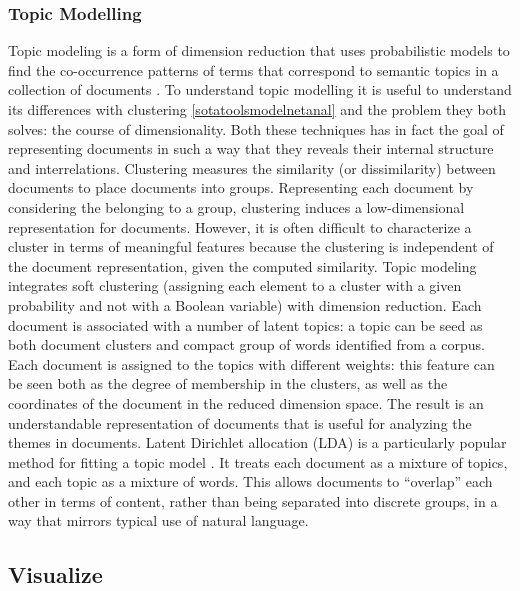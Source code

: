 \documentclass[]{book}
\begin{document}
\subsubsection{Topic Modelling}\label{sotatoolsmodeltopicmodel}

Topic modeling is a form of dimension reduction that uses probabilistic
models to find the co-occurrence patterns of terms that correspond to
semantic topics in a collection of documents
\citep{crain2012dimensionality}. To understand topic modelling it is
useful to understand its differences with clustering
\ref{sotatoolsmodelnetanal} and the problem they both solves: the course
of dimensionality. Both these techniques has in fact the goal of
representing documents in such a way that they reveals their internal
structure and interrelations. Clustering measures the similarity (or
dissimilarity) between documents to place documents into groups.
Representing each document by considering the belonging to a group,
clustering induces a low-dimensional representation for documents.
However, it is often difficult to characterize a cluster in terms of
meaningful features because the clustering is independent of the
document representation, given the computed similarity. Topic modeling
integrates soft clustering (assigning each element to a cluster with a
given probability and not with a Boolean variable) with dimension
reduction. Each document is associated with a number of latent topics: a
topic can be seed as both document clusters and compact group of words
identified from a corpus. Each document is assigned to the topics with
different weights: this feature can be seen both as the degree of
membership in the clusters, as well as the coordinates of the document
in the reduced dimension space. The result is an understandable
representation of documents that is useful for analyzing the themes in
documents. Latent Dirichlet allocation (LDA) is a particularly popular
method for fitting a topic model \citep{blei2003latent}. It treats each
document as a mixture of topics, and each topic as a mixture of words.
This allows documents to ``overlap'' each other in terms of content,
rather than being separated into discrete groups, in a way that mirrors
typical use of natural language.

\subsection{Visualize}\label{sotatoolsvisualize}
\end{document}
